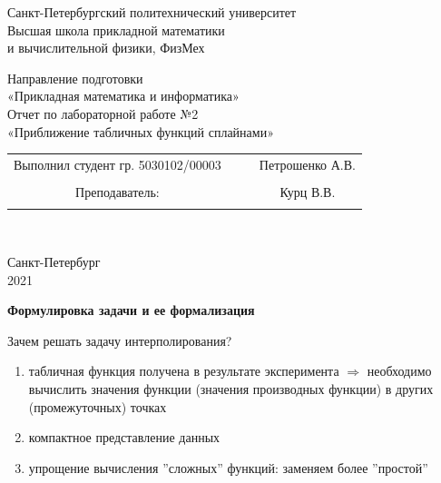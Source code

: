 \documentclass{article}
\begin{document}
	\begin{center}
		\hfill \break
		\begin{center}
			\huge{Санкт-Петербургский политехнический университет\\
				Высшая школа прикладной математики\\
				и вычислительной физики, ФизМех}
		\end{center}
		\hfill \break
		\hfill \break
		\hfill \break
		\hfill \break
		\hfill \break
		\huge{Направление подготовки\\
			«Прикладная математика и информатика»}\\
		\hfill \break
		\hfill \break
		\hfill \break
		\hfill \break
		\hfill \break
		\hfill \break
		\fontsize{14pt}{14pt}\selectfont
		Отчет по лабораторной работе №2\\
		«Приближение табличных функций сплайнами»\\
		\hfill \break
		\hfill \break
		\hfill \break
		\hfill \break
		\hfill \break
	\end{center}
	\hfill \break
	\hfill \break
	\fontsize{12pt}{12pt}\selectfont
	\begin{tabular}{cccc}
		\hspace{1cm}Выполнил студент гр. 5030102/00003 & {\hspace{3cm}} & & Петрошенко А.В. \\\\
		\hspace{-3cm}Преподаватель: &{\hspace{1cm}}& & {\hspace{1cm}} Курц В.В. \\\\
	\end{tabular}\\
	\hfill \break
	\hfill \break
	\hfill \break
	\hfill \break
	\hfill \break
	\hfill \break
	\begin{center} Санкт-Петербург\\ 
		2021\\
	\end{center}
	\thispagestyle{empty}
	\newpage
	\begin{center} \textbf{Формулировка задачи и ее формализация}\end{center}
	Зачем решать задачу интерполирования?
	\begin{enumerate}
		\item табличная функция получена в результате эксперимента $\Rightarrow$ необходимо вычислить значения функции (значения производных функции) в других (промежуточных) точках
		\item компактное представление данных
		\item упрощение вычисления ”сложных” функций: заменяем более ”простой”
	\end{enumerate}
\end{document}
